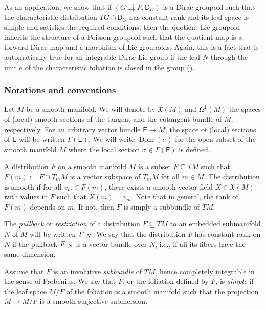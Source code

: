 \documentclass{amsart}
\theoremstyle{definition}
\begin{document}
\medskip

As an application, we show that if $(G{{\rightrightarrows}} P, \mathsf D_G)$ is a
Dirac groupoid such that the characteristic distribution $TG\cap\mathsf D_G$ 
has constant rank and its leaf space is simple and satisfies the 
required conditions, then the quotient Lie groupoid
inherits the structure of a Poisson groupoid such that the quotient 
map is a forward Dirac map and a morphism of Lie groupoids.
 Again, this is a fact that is automatically true
for an integrable Dirac Lie group 
if the leaf $N$ through the unit $e$ of the characteristic foliation is closed 
in the group (\cite{Jotz11a}). 

\subsubsection*{\textbf{Notations and conventions}}
Let $M$ be a smooth manifold. We will denote by ${\mathfrak{X}}(M)$ and $\Omega^1(M)$ the
spaces of (local) smooth sections of the tangent and the cotangent bundle of $M$,
respectively. For an arbitrary vector bundle $\mathsf E\to M$, the space of
(local) sections of $\mathsf E$ will be written $\Gamma(\mathsf E)$. 
We will write $\operatorname{Dom}(\sigma)$ for the open subset of the smooth manifold $M$
where the local section $\sigma\in\Gamma(\mathsf E)$ is defined.

\medskip

A distribution $F$ on a smooth manifold $M$
is a subset $F\subseteq TM$ such that $F(m):=F\cap T_mM$ is a vector subspace
of $T_mM$ for all $m\in M$.
The distribution is smooth if for all
$v_m\in F(m)$, there exists a smooth vector field 
$X\in{\mathfrak{X}}(M)$ with values in $F$ such that $X(m)=v_m$.
Note that in general, the rank of 
$F(m)$ depends on $m$. If not, then $F$ is simply a subbundle of $TM$.

The \emph{pullback} or \emph{restriction} of a distribution $F\subseteq TM$ to an embedded
 submanifold $N$ of $M$  will be written $F{\arrowvert_{{N}}}$. We say that the distribution
$F$ has constant rank on $N$ if the pullback $F{\arrowvert_{{N}}}$ is a vector bundle over $N$, i.e.,
if all its fibers have the same dimension.

\medskip

Assume that $F$ is an involutive \emph{subbundle} of $TM$, hence completely integrable 
in the sense of Frobenius. We say that $F$, or the foliation defined by $F$,
is \emph{simple} if the leaf space $M/F$ of the foliation is 
a smooth manifold such that the projection $M\to M/F$ is a smooth surjective submersion.
\end{document}
